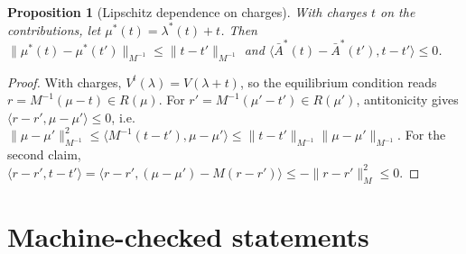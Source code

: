 \documentclass[preprint,11pt]{elsarticle}
\newtheorem{proposition}[theorem]{Proposition}
\theoremstyle{definition}
\theoremstyle{remark}
\newcommand{\Abar}{\bar A}
\newcommand{\ip}[2]{\langle #1,#2\rangle}
\begin{document}
\begin{proposition}[Lipschitz dependence on charges]\label{prop:charges}
With charges $t$ on the contributions, let $\mu^*(t)=\lambda^*(t)+t$. Then $\|\mu^*(t)-\mu^*(t')\|_{M^{-1}}\le\|t-t'\|_{M^{-1}}$ and $\ip{\Abar^*(t)-\Abar^*(t')}{t-t'}\le0$.
\end{proposition}
\begin{proof}
With charges, $V^t(\lambda)=V(\lambda+t)$, so the equilibrium condition reads $r=M^{-1}(\mu-t)\in R(\mu)$. For $r'=M^{-1}(\mu'-t')\in R(\mu')$, antitonicity gives $\ip{r-r'}{\mu-\mu'}\le0$, i.e.\ $\|\mu-\mu'\|^2_{M^{-1}}\le\ip{M^{-1}(t-t')}{\mu-\mu'}\le\|t-t'\|_{M^{-1}}\|\mu-\mu'\|_{M^{-1}}$. For the second claim, $\ip{r-r'}{t-t'}=\ip{r-r'}{(\mu-\mu')-M(r-r')}\le-\|r-r'\|^2_M\le0$.
\end{proof}

\section{Machine-checked statements}\label{app:lean}
\end{document}

